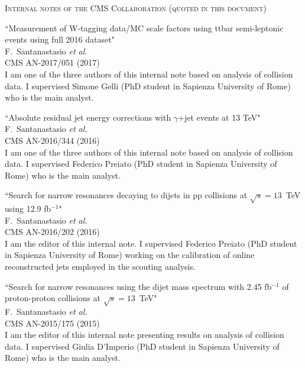 \documentclass[10pt, a4paper]{article}
\begin{document}
\begin{thebibliography}{599}
\vspace{0.1cm} \begin{center} \textsc{Internal notes of the CMS
    Collaboration (quoted in this document)} \end{center} \vspace{0.05cm}

``Measurement of W-tagging data/MC scale factors using ttbar semi-leptonic events using full 2016 dataset"
  \\{}F.~Santanastasio {\it et al.}
  \\{}CMS AN-2017/051 (2017)
  \\ I am one of the three authors of this internal note based on
  analysis of collision data. I supervised
  Simone Gelli (PhD student in Sapienza University of Rome) who is
  the main analyst.

``Absolute residual jet energy corrections with $\gamma$+jet events at 13 TeV"
  \\{}F.~Santanastasio {\it et al.}
  \\{}CMS AN-2016/344 (2016)
  \\ I am one of the three authors of this internal note based on
  analysis of collision data. I supervised
  Federico Preiato (PhD student in Sapienza University of Rome) who is
  the main analyst.

``Search for narrow resonances decaying to dijets in pp collisions at $\sqrt{s}=13$~TeV using 12.9 fb$^{-1}$"
  \\{}F.~Santanastasio {\it et al.}
  \\{}CMS AN-2016/202 (2016)
  \\ I am the editor of this internal note. I supervised Federico Preiato (PhD student in Sapienza University of Rome)
  working on the calibration of online reconstructed jets employed in the scouting analysis.

``Search for narrow resonances using the dijet mass spectrum with 2.45 fb$^{-1}$ of proton-proton collisions at $\sqrt{s}=13$~TeV"
  \\{}F.~Santanastasio {\it et al.}
  \\{}CMS AN-2015/175 (2015)
  \\ I am the editor of this internal note presenting results on
  analysis of collision data. I supervised Giulia D'Imperio (PhD
  student in Sapienza University of Rome) who is the main analyst.


\end{thebibliography}
\end{document}
